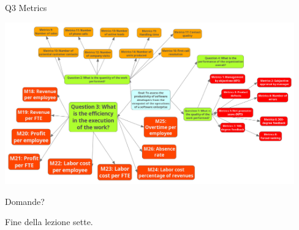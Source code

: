 \documentclass{beamer}
\begin{document}
\begin{frame}{\centerline{Q3 Metrics}}

\begin{center}
\includegraphics[width=125mm]{A2022.ScaleDeiDati/20180904_CaseStudy_GoalQuestions_M4.png}
\newline
\end{center}

\end{frame}

\begin{frame}
{\centerline{Domande?}}
\vspace{1cm}
\begin{center}
    \LARGE{Fine della lezione sette.}
\end{center}

\end{frame}
\end{document}
